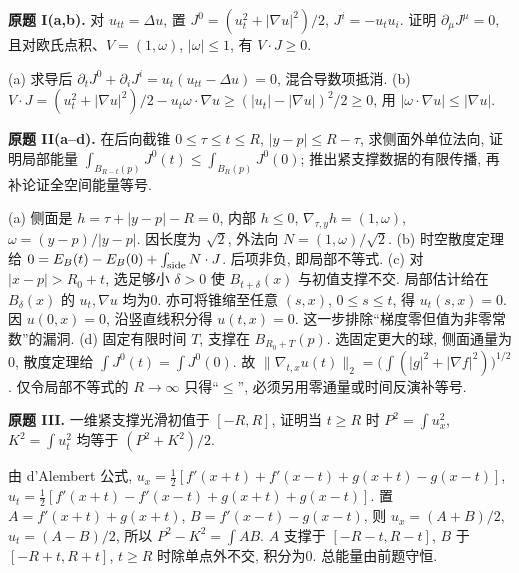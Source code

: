 \begin{exercise}\label{ps:6I}
\textbf{原题 I(a,b).} 对 $u_{tt}=\Delta u$, 置 $J^0=(u_t^2+|\nabla u|^2)/2$, $J^i=-u_tu_i$. 证明 $\partial_\mu J^\mu=0$, 且对欧氏点积、$V=(1,\omega)$, $|\omega|\le1$, 有 $V\cdot J\ge0$.
\end{exercise}
\begin{solution}
(a) 求导后 $\partial_tJ^0+\partial_iJ^i=u_t(u_{tt}-\Delta u)=0$, 混合导数项抵消.
(b) $V\cdot J=(u_t^2+|\nabla u|^2)/2-u_t\omega\cdot\nabla u\ge(|u_t|-|\nabla u|)^2/2\ge0$, 用 $|\omega\cdot\nabla u|\le|\nabla u|$.
\end{solution}
\begin{exercise}\label{ps:6II}
\textbf{原题 II(a--d).} 在后向截锥 $0\le\tau\le t\le R$, $|y-p|\le R-\tau$, 求侧面外单位法向, 证明局部能量 $\int_{B_{R-t}(p)}J^0(t)\le\int_{B_R(p)}J^0(0)$; 推出紧支撑数据的有限传播, 再补论证全空间能量等号.
\end{exercise}
\begin{solution}
(a) 侧面是 $h=\tau+|y-p|-R=0$, 内部 $h\le0$, $\nabla_{\tau,y}h=(1,\omega)$, $\omega=(y-p)/|y-p|$. 因长度为 $\sqrt2$, 外法向 $N=(1,\omega)/\sqrt2$.
(b) 时空散度定理给 $0=E_B(t)-E_B(0)+\int_{\rm side}N\cdot J$. 后项非负, 即局部不等式.
(c) 对 $|x-p|>R_0+t$, 选足够小 $\delta>0$ 使 $B_{t+\delta}(x)$ 与初值支撑不交. 局部估计给在 $B_\delta(x)$ 的 $u_t,\nabla u$ 均为0. 亦可将锥缩至任意 $(s,x)$, $0\le s\le t$, 得 $u_t(s,x)=0$. 因 $u(0,x)=0$, 沿竖直线积分得 $u(t,x)=0$. 这一步排除“梯度零但值为非零常数”的漏洞.
(d) 固定有限时间 $T$, 支撑在 $B_{R_0+T}(p)$. 选固定更大的球, 侧面通量为0, 散度定理给 $\int J^0(t)=\int J^0(0)$. 故 $\|\nabla_{t,x}u(t)\|_2=\bigl(\int(|g|^2+|\nabla f|^2)\bigr)^{1/2}$. 仅令局部不等式的 $R\to\infty$ 只得“$\le$”, 必须另用零通量或时间反演补等号.
\end{solution}
\begin{exercise}\label{ps:6III}
\textbf{原题 III.} 一维紧支撑光滑初值于 $[-R,R]$, 证明当 $t\ge R$ 时 $P^2=\int u_x^2$, $K^2=\int u_t^2$ 均等于 $(P^2+K^2)/2$.
\end{exercise}
\begin{solution}
由 d'Alembert 公式,
$u_x=\tfrac12[f'(x+t)+f'(x-t)+g(x+t)-g(x-t)]$,
$u_t=\tfrac12[f'(x+t)-f'(x-t)+g(x+t)+g(x-t)]$.
置 $A=f'(x+t)+g(x+t)$, $B=f'(x-t)-g(x-t)$, 则 $u_x=(A+B)/2$, $u_t=(A-B)/2$, 所以 $P^2-K^2=\int AB$. $A$ 支撑于 $[-R-t,R-t]$, $B$ 于 $[-R+t,R+t]$, $t\ge R$ 时除单点外不交, 积分为0. 总能量由前题守恒.
\end{solution}
